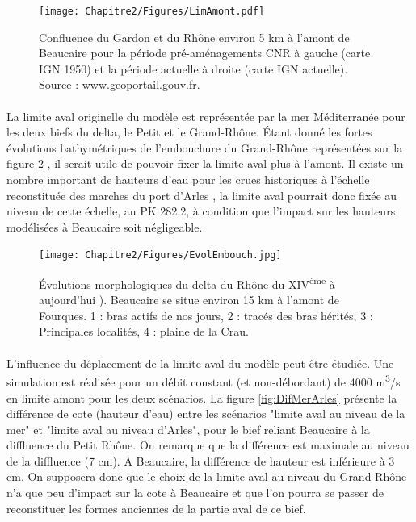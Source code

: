 	 \begin{figure}[h]
		\centering
	    \texttt{[image: Chapitre2/Figures/LimAmont.pdf]}
        \caption{Confluence du Gardon et du Rhône environ 5 km à l'amont de Beaucaire pour la période pré-aménagements CNR à gauche (carte IGN 1950) et la période actuelle à droite (carte IGN actuelle). Source : \url{www.geoportail.gouv.fr}.}
		\label{fig:LimAmont}
	\end{figure}
	 
	\paragraph{} La limite aval originelle du modèle est représentée par la mer Méditerranée pour les deux biefs du delta, le Petit et le Grand-Rhône. Étant donné les fortes évolutions bathymétriques de l'embouchure du Grand-Rhône représentées sur la figure \ref{fig:Embouch} \citep{pichard_les_2014}, il serait utile de pouvoir fixer la limite aval plus à l'amont. Il existe un nombre important de hauteurs d'eau pour les crues historiques à l'échelle reconstituée des marches du port d'Arles \citep{pichard_les_1995}, la limite aval pourrait donc fixée au niveau de cette échelle, au PK 282.2, à condition que l'impact sur les hauteurs modélisées à Beaucaire soit négligeable.
	
	\begin{figure}[h]
		\centering
	    \texttt{[image: Chapitre2/Figures/EvolEmbouch.jpg]}
        \caption{Évolutions morphologiques du delta du Rhône du XIV\textsuperscript{ème} à aujourd'hui \citep{pichard_les_2014}). Beaucaire se situe environ 15 km à l'amont de Fourques. 1 : bras actifs de nos jours, 2 : tracés des bras hérités, 3 : Principales localités, 4 : plaine de la Crau.}
		\label{fig:Embouch}
	\end{figure}

	\paragraph{} L'influence du déplacement de la limite aval du modèle peut être étudiée. Une simulation est réalisée pour un débit constant (et non-débordant) de 4000 m\textsuperscript{3}/s en limite amont pour les deux scénarios. La figure \ref{fig:DifMerArles} présente la différence de cote (hauteur d'eau) entre les scénarios "limite aval au niveau de la mer" et "limite aval au niveau d'Arles", pour le bief reliant Beaucaire à la diffluence du Petit Rhône. On remarque que la différence est maximale au niveau de la diffluence (7 cm). A Beaucaire, la différence de hauteur est inférieure à 3 cm. On supposera donc que le choix de la limite aval au niveau du Grand-Rhône n'a que peu d'impact sur la cote à Beaucaire et que l'on pourra se passer de reconstituer les formes anciennes de la partie aval de ce bief. 
	 
